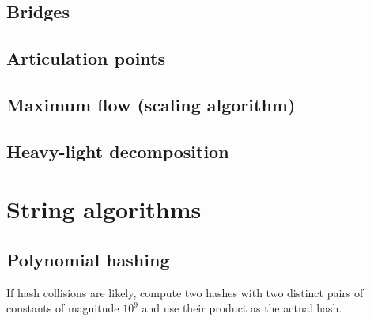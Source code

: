 \documentclass{article}
\begin{document}
\subsection {Bridges}

\subsection {Articulation points}

\subsection {Maximum flow (scaling algorithm)}

\subsection {Heavy-light decomposition}

\section {String algorithms}

\subsection {Polynomial hashing}

If hash collisions are likely, compute two hashes with two distinct pairs of constants of magnitude $10^9$ and use their product as the actual hash.


\end{document}
